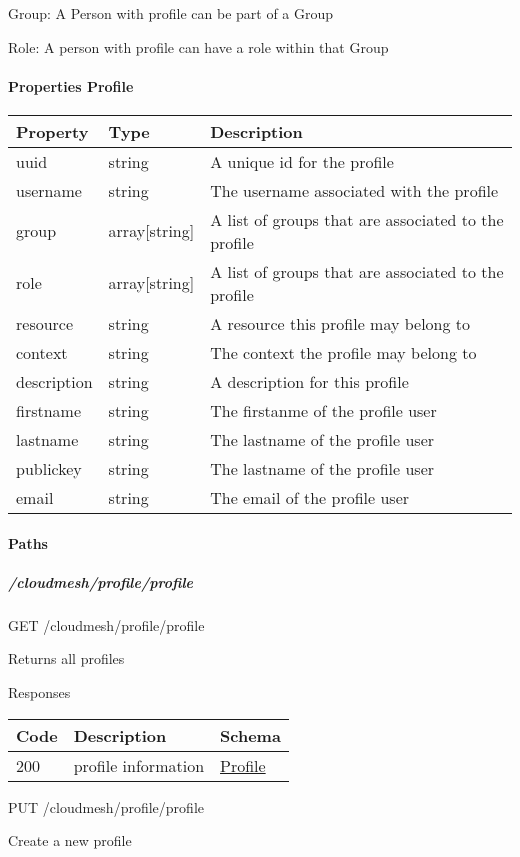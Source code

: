 \documentclass[9pt,]{article}
\let\oldparagraph\paragraph
\renewcommand{\paragraph}[1]{\oldparagraph{#1}\mbox{}}
\let\oldsubparagraph\subparagraph
\renewcommand{\subparagraph}[1]{\oldsubparagraph{#1}\mbox{}}
\begin{document}
Group: A Person with profile can be part of a Group

Role: A person with profile can have a role within that Group

\hypertarget{properties-profile}{%
\paragraph{Properties Profile}\label{properties-profile}}

\begin{longtable}[]{@{}lll@{}}
\toprule
Property & Type & Description\tabularnewline
\midrule
\endhead
uuid & string & A unique id for the profile\tabularnewline
username & string & The username associated with the
profile\tabularnewline
group & array{[}string{]} & A list of groups that are associated to the
profile\tabularnewline
role & array{[}string{]} & A list of groups that are associated to the
profile\tabularnewline
resource & string & A resource this profile may belong to\tabularnewline
context & string & The context the profile may belong to\tabularnewline
description & string & A description for this profile\tabularnewline
firstname & string & The firstanme of the profile user\tabularnewline
lastname & string & The lastname of the profile user\tabularnewline
publickey & string & The lastname of the profile user\tabularnewline
email & string & The email of the profile user\tabularnewline
\bottomrule
\end{longtable}

\hypertarget{paths}{%
\paragraph{Paths}\label{paths}}

\hypertarget{cloudmeshprofileprofile}{%
\subparagraph{/cloudmesh/profile/profile}\label{cloudmeshprofileprofile}}

GET /cloudmesh/profile/profile

Returns all profiles

Responses

\begin{longtable}[]{@{}lll@{}}
\toprule
Code & Description & Schema\tabularnewline
\midrule
\endhead
200 & profile information &
\protect\hyperlink{profile}{Profile}\tabularnewline
\bottomrule
\end{longtable}

PUT /cloudmesh/profile/profile

Create a new profile
\end{document}

